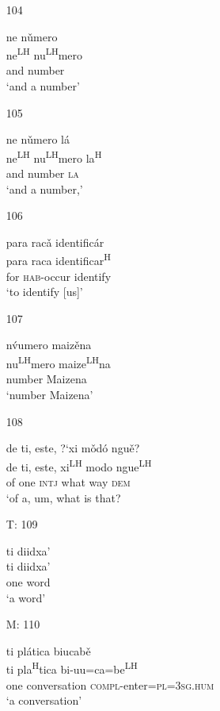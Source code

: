 \begin{itemize}
\item[104]
 
\glll   ne n\v{u}mero\\
ne\textsuperscript{LH} nu\textsuperscript{LH}mero\\
 and number\\
\glt `and a number'
 


\item[105]
 
\glll   ne n\v{u}mero l\'{a}\\
ne\textsuperscript{LH} nu\textsuperscript{LH}mero la\textsuperscript{H}\\
and number \textsc{la}\\
\glt `and a number,' 
 

\item[106]
 
\glll   para rac\v{a} identific\'{a}r\\
para raca identificar\textsuperscript{H}\\
for \textsc{hab}-occur identify\\
\glt `to identify [us]'
 


\item[107]
 
\glll   n\'v{u}mero maiz\v{e}na\\
 nu\textsuperscript{LH}mero maize\textsuperscript{LH}na\\
 number Maizena\\
\glt `number Maizena'
 

\item[108]
 
\glll  de ti, este, {?`}xi m\v{o}d\'{o} ngu\v{e}?\\
de ti, este, xi\textsuperscript{LH} modo ngue\textsuperscript{LH}\\
 of one \textsc{intj} what way \textsc{dem}\\
\glt `of a, um, what is that?
 

\item[T: 109]
 
\glll   ti diidxa'\\
 ti diidxa'\\ 
 one word\\
\glt `a word'
 


\item[M: 110]
 
\glll   ti pl\'{a}tica biucab\v{e}\\
ti pla\textsuperscript{H}tica bi-uu=ca=be\textsuperscript{LH}\\
one conversation \textsc{compl}-enter=\textsc{pl}=\textsc{3sg.hum}\\
\glt `a conversation'
 



\end{itemize}
